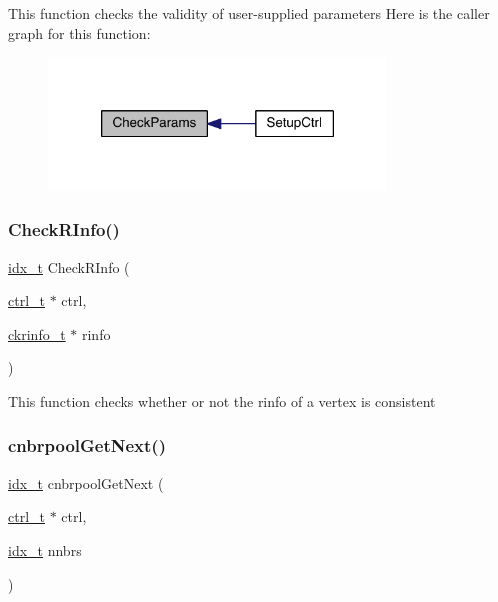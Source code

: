 This function checks the validity of user-\/supplied parameters Here is the caller graph for this function\+:\nopagebreak
\begin{figure}[H]
\begin{center}
\leavevmode
\includegraphics[width=254pt]{a00945_a279ffe27d8412909f9117b5ca4721dce_icgraph}
\end{center}
\end{figure}
\mbox{\label{a00945_adb0cfc48ae3464b6fab963903edc0420}} 
\subsubsection{\texorpdfstring{Check\+R\+Info()}{CheckRInfo()}}
{\footnotesize\ttfamily \hyperlink{a00876_aaa5262be3e700770163401acb0150f52}{idx\+\_\+t} Check\+R\+Info (\begin{DoxyParamCaption}\item[{\hyperlink{a00742}{ctrl\+\_\+t} $\ast$}]{ctrl,  }\item[{\hyperlink{a00718}{ckrinfo\+\_\+t} $\ast$}]{rinfo }\end{DoxyParamCaption})}

This function checks whether or not the rinfo of a vertex is consistent \mbox{\label{a00945_a5c7982f300512c943ce53a0531529ae8}} 
\subsubsection{\texorpdfstring{cnbrpool\+Get\+Next()}{cnbrpoolGetNext()}}
{\footnotesize\ttfamily \hyperlink{a00876_aaa5262be3e700770163401acb0150f52}{idx\+\_\+t} cnbrpool\+Get\+Next (\begin{DoxyParamCaption}\item[{\hyperlink{a00742}{ctrl\+\_\+t} $\ast$}]{ctrl,  }\item[{\hyperlink{a00876_aaa5262be3e700770163401acb0150f52}{idx\+\_\+t}}]{nnbrs }\end{DoxyParamCaption})}

